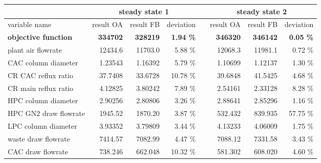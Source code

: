 \begin{minipage}{\linewidth}
    \center
    \footnotesize
    \begin{tabular}{lrrrcrrr}
        & \multicolumn{3}{c}{steady state 1} & & \multicolumn{3}{c}{steady state 2} \\ \hline
        \rowcolor{white} variable name & result OA & result FB & deviation & & result OA & result FB & deviation \\ \hline
        \textbf{objective function} & \textbf{334702} & \textbf{328219} & \textbf{1.94 \%} & & \textbf{346320} & \textbf{346142} & \textbf{0.05 \%} \\
        plant air flowrate & 12434.6 & 11703.0 & 5.88 \% & & 12068.3 & 11981.1 & 0.72 \% \\
        CAC column diameter & 1.23543 & 1.16392 & 5.79 \% & & 1.10699 & 1.12137 & 1.30 \% \\
        CR CAC reflux ratio & 37.7408 & 33.6728 & 10.78 \% & & 39.6848 & 41.5425 & 4.68 \% \\
        CR main reflux ratio & 4.12825 & 3.80242 & 7.89 \% & & 2.54161 & 2.33128 & 8.28 \% \\
        HPC column diameter & 2.90256 & 2.80806 & 3.26 \% & & 2.88641 & 2.85296 & 1.16 \% \\
        HPC GN2 draw flowrate & 1945.52 & 1870.20 & 3.87 \% & & 532.432 & 839.935 & 57.75 \% \\
        LPC column diameter & 3.93352 & 3.79809 & 3.44 \% & & 4.13233 & 4.06009 & 1.75 \% \\
        waste draw flowrate & 7414.57 & 7082.99 & 4.47 \% & & 7088.12 & 7331.58 & 3.43 \% \\
        CAC draw flowrate & 738.246 & 662.048 & 10.32 \% & & 581.302 & 608.020 & 4.60 \% \\ \hline
    \end{tabular}
\end{minipage}
